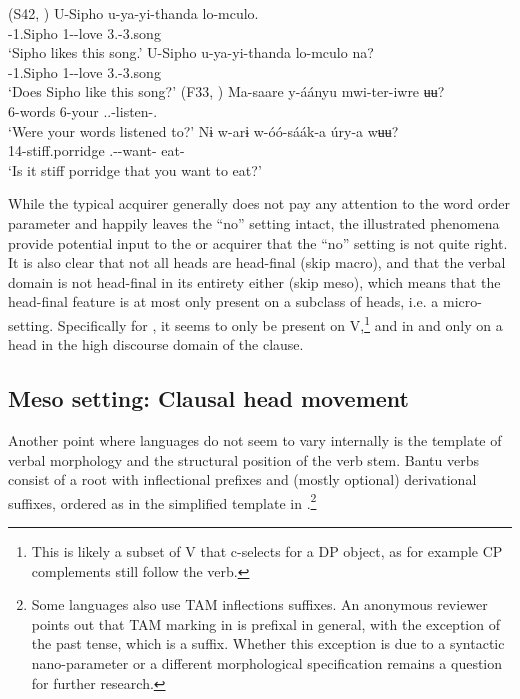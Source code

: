 \documentclass[output=paper]{langsci/langscibook}
\begin{document}
\ea\label{ex:key:3.8} (S42, \citealt[69]{Buell2005})
	\ea
	\gll	U-Sipho  u-ya-yi-thanda  lo-mculo.\\
            \Aug-1.Sipho  1\Sm-\Om{}-love  3.\Dem{}-3.song\\
	\glt    ‘Sipho likes this song.’
	\ex
	\gll	 U-Sipho  u-ya-yi-thanda  lo-mculo  na?\\
            \Aug-1.Sipho  1\Sm-\Om{}-love  3.\Dem{}-3.song  \glossQ{}\\
	\glt    ‘Does Sipho like this song?’
    \z
\z
\newpage
\ea {} (F33, \citealt[51]{Gibson2012})
    \ea
	\gll	 Ma-saare  y-áányu  mwi-ter-iwre  ʉʉ?\\
            6-words  6-your  \Spl.\Sm{}.\Pst{}-listen-\Pfv.\Pass{}  \glossQ{}\\
	\glt    ‘Were your words listened to?’
	\ex
	\gll	 Nɨ  w-arɨ  w-óó-sáák-a  úry-a  wʉʉ?\\
            \Cop{}  14-stiff.porridge  \Ssg.\Sm-\Prog{}-want-\Fv{}  eat-\Fv{}  \glossQ{}\\
    \glt    ‘Is it stiff porridge that you want to eat?’
	\z
\z

While the typical  acquirer generally does not pay any attention to the
word order parameter and happily leaves the \enquote{no} setting intact, the
illustrated phenomena provide potential input to the  or  acquirer
that the \enquote{no} setting is not quite right. It is also clear that not all heads
are head-final (skip macro), and that the verbal domain is not head-final in
its entirety either (skip meso), which means that the head-final feature is at
most only present on a subclass of heads, i.e. a micro-setting. Specifically
for , it seems to only be present on V,\footnote{This is likely a subset
of V that c-selects for a DP object, as for example CP complements still follow
the verb.} and in  and  only on a head in the high discourse domain of
the clause.

\subsection{Meso setting: Clausal head movement}\label{sub:3.2.2}

Another point where  languages do not seem to vary internally is the
template of verbal morphology and the structural position of the verb stem.
Bantu verbs consist of a root with inflectional prefixes and (mostly optional)
derivational suffixes, ordered as in the simplified template in
 .\footnote{Some  languages also use \gls{TAM} inflections
    suffixes. An anonymous reviewer points out that \gls{TAM} marking in
     is prefixal in general, with the exception of the past tense,
    which is a suffix.  Whether this exception is due to a syntactic
nano-parameter or a different morphological specification remains a question
for further research.}
\end{document}
